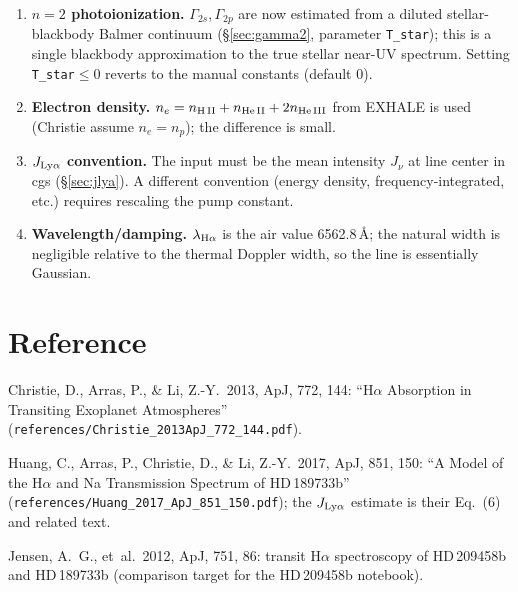 \documentclass[english,a4paper]{my_memo}
\begin{document}
\begin{enumerate}
  \item \textbf{$n=2$ photoionization.} $\Gamma_{2s},\Gamma_{2p}$ are now
    estimated from a diluted stellar-blackbody Balmer continuum
    (\S\ref{sec:gamma2}, parameter \texttt{T\_star}); this is a single
    blackbody approximation to the true stellar near-UV spectrum. Setting
    \texttt{T\_star}$\le0$ reverts to the manual constants (default $0$).
  \item \textbf{Electron density.} $n_e=n_{\rm H\,II}+n_{\rm He\,II}
    +2n_{\rm He\,III}$ from EXHALE is used (Christie assume $n_e=n_p$); the
    difference is small.
  \item \textbf{$J_{\rm Ly\alpha}$ convention.} The input must be the
    mean intensity $J_\nu$ at line center in cgs (\S\ref{sec:jlya}). A
    different convention (energy density, frequency-integrated, etc.)
    requires rescaling the pump constant.
  \item \textbf{Wavelength/damping.} $\lambda_{\rm H\alpha}$ is the air
    value 6562.8\,\AA{}; the natural width is negligible relative to the
    thermal Doppler width, so the line is essentially Gaussian.
\end{enumerate}

\section*{Reference}
\noindent Christie, D., Arras, P., \& Li, Z.-Y.\ 2013, ApJ, 772, 144:
``H$\alpha$ Absorption in Transiting Exoplanet Atmospheres''
(\texttt{references/Christie\_2013ApJ\_772\_144.pdf}).

\medskip
\noindent Huang, C., Arras, P., Christie, D., \& Li, Z.-Y.\ 2017, ApJ,
851, 150: ``A Model of the H$\alpha$ and Na Transmission Spectrum of
HD\,189733b'' (\texttt{references/Huang\_2017\_ApJ\_851\_150.pdf});
the $J_{\rm Ly\alpha}$ estimate is their Eq.~(6) and related text.

\medskip
\noindent Jensen, A.~G., et~al.\ 2012, ApJ, 751, 86: transit H$\alpha$
spectroscopy of HD\,209458b and HD\,189733b (comparison target for the
HD\,209458b notebook).
\end{document}
